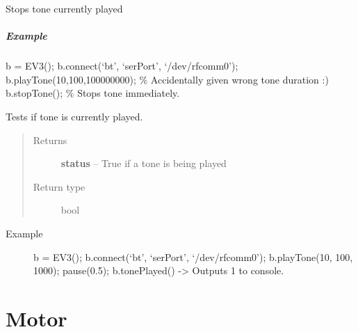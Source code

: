 \documentclass[letterpaper,10pt,english]{sphinxmanual}
\begin{document}
\begin{fulllineitems}
\begin{fulllineitems}
\end{fulllineitems}


\begin{fulllineitems}
\label{source:source.EV3.stopTone}
Stops tone currently played
\paragraph{Example}

b = EV3(); 
b.connect(`bt', `serPort', `/dev/rfcomm0'); 
b.playTone(10,100,100000000);  \% Accidentally given wrong tone duration :) 
b.stopTone();  \% Stops tone immediately. 

\end{fulllineitems}


\begin{fulllineitems}
\label{source:source.EV3.tonePlayed}
Tests if tone is currently played.
\begin{quote}\begin{description}
\item[{Returns}] \leavevmode
\textbf{status} -- True if a tone is being played

\item[{Return type}] \leavevmode
bool

\end{description}\end{quote}
\begin{description}
\item[{Example}] \leavevmode
b = EV3(); 
b.connect(`bt', `serPort', `/dev/rfcomm0'); 
b.playTone(10, 100, 1000); 
pause(0.5); 
b.tonePlayed() -\textgreater{} Outputs 1 to console. 

\end{description}

\end{fulllineitems}


\end{fulllineitems}



\chapter{Motor}
\label{source:motor}
\end{document}
